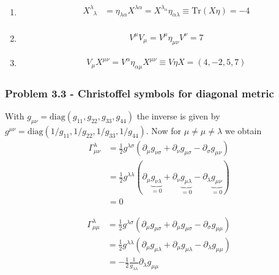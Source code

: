 \documentclass[10pt,a4paper]{article}
\theoremstyle{definition}
\begin{document}
\begin{enumerate}
\item 
\begin{align}
 X^\lambda_{\;\;\lambda}&=\eta_{\lambda\alpha}X^{\lambda\alpha}=X^{\lambda_\alpha}\eta_{\alpha\lambda}\equiv  \text{Tr}(X\eta)=-4\\
\end{align}

\item 
\begin{align}
V^\mu V_\mu = V^\mu \eta_{\mu\nu}V^\nu=7
\end{align}

\item 
\begin{align}
V_\mu X^{\mu\nu} = V^\alpha\eta_{\alpha\mu} X^{\mu\nu}\equiv V\eta X=(4,-2,5,7)
\end{align}
\end{enumerate}


\subsubsection{Problem 3.3 - Christoffel symbols for diagonal metric}
With $g_{\mu\nu}=\text{diag}(g_{11},g_{22},g_{33},g_{44})$ the inverse is given by $g^{\mu\nu}=\text{diag}(1/g_{11},1/g_{22},1/g_{33},1/g_{44})$. Now for $\mu\neq\mu\neq\lambda$ we obtain
\begin{align}
\Gamma^\lambda_{\mu\nu}
&=\frac{1}{2}g^{\lambda\sigma}(\partial_\mu g_{\nu\sigma}+\partial_\nu g_{\mu\sigma}-\partial_\sigma g_{\mu\nu})\\
&=\frac{1}{2}g^{\lambda\lambda}(\partial_\mu \underbrace{g_{\nu\lambda}}_{=0}+\partial_\nu \underbrace{g_{\mu\lambda}}_{=0}-\partial_\lambda \underbrace{g_{\mu\nu}}_{=0})\\
&=0
\end{align}

\begin{align}
\Gamma^\lambda_{\mu\mu}
&=\frac{1}{2}g^{\lambda\sigma}(\partial_\mu g_{\mu\sigma}+\partial_\mu g_{\mu\sigma}-\partial_\sigma g_{\mu\mu})\\
&=\frac{1}{2}g^{\lambda\lambda}(\partial_\mu g_{\mu\lambda}+\partial_\mu g_{\mu\lambda}-\partial_\lambda g_{\mu\mu})\\
&=-\frac{1}{2}\frac{1}{g_{\lambda\lambda}}\partial_\lambda g_{\mu\mu}
\end{align}
\end{document}
